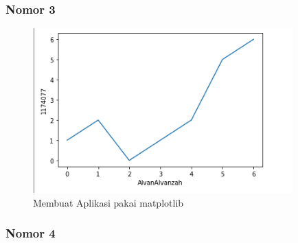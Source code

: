 \subsubsection{Nomor 3}
\hfill\break

\begin{figure}[H]
\centerline{\includegraphics[width=10cm]{figures/1174077/3/7.png}}
\caption{Membuat Aplikasi pakai matplotlib}
\label{labelgambar}
\end{figure}

\subsubsection{Nomor 4}
\hfill\break

